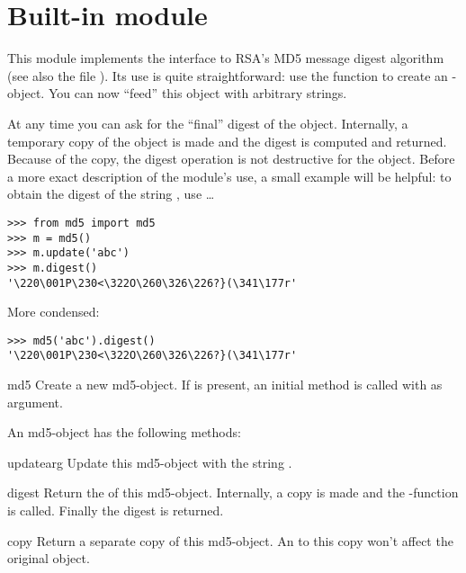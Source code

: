 \section{Built-in module }

This module implements the interface to RSA's MD5 message digest
algorithm (see also the file ). Its use is quite
straightforward: use the function  to create an
-object. You can now ``feed'' this object with arbitrary
strings.

At any time you can ask for the ``final'' digest of the object. Internally,
a temporary copy of the object is made and the digest is computed and
returned. Because of the copy, the digest operation is not destructive
for the object. Before a more exact description of the module's use, a small
example will be helpful: 
to obtain the digest of the string , use \ldots

\bcode\begin{verbatim}
>>> from md5 import md5
>>> m = md5()
>>> m.update('abc')
>>> m.digest()
'\220\001P\230<\322O\260\326\226?}(\341\177r'
\end{verbatim}\ecode

More condensed:

\bcode\begin{verbatim}
>>> md5('abc').digest()
'\220\001P\230<\322O\260\326\226?}(\341\177r'
\end{verbatim}\ecode

\renewcommand{\indexsubitem}{(in module md5)}
\begin{funcdesc}{md5}{}
  Create a new md5-object. If  is present, an initial
   method is called with  as argument.
\end{funcdesc}

An md5-object has the following methods:

\renewcommand{\indexsubitem}{(md5 method)}
\begin{funcdesc}{update}{arg}
  Update this md5-object with the string .
\end{funcdesc}

\begin{funcdesc}{digest}{}
  Return the  of this md5-object. Internally, a copy is made
  and the \C-function  is called. Finally the digest is
  returned.
\end{funcdesc}

\begin{funcdesc}{copy}{}
  Return a separate copy of this md5-object.  An  to this
  copy won't affect the original object.
\end{funcdesc}
